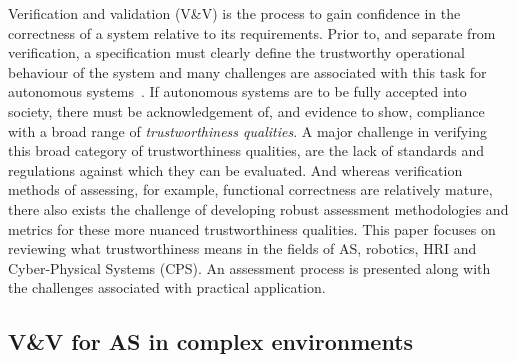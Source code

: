 Verification and validation (V\&V) is the process to gain confidence in the correctness of a system relative to its requirements. Prior to, and separate from verification, a specification must clearly define the trustworthy operational behaviour of the system and many challenges are associated with this task for autonomous systems~\cite{Abeywickrama2022}. 
%
%
If autonomous systems are to be fully accepted into society, there must be acknowledgement of, and evidence to show, compliance with a broad range of \emph{trustworthiness qualities}. 
% 
A major challenge in verifying this broad category of trustworthiness qualities, are the lack of standards and regulations against which they can be evaluated. And whereas verification methods of assessing, for example, functional correctness are relatively mature, there also exists the challenge of developing robust assessment methodologies and metrics for these more nuanced trustworthiness qualities. 
%
%
This paper focuses on reviewing what trustworthiness means in the fields of AS, robotics, HRI and Cyber-Physical Systems (CPS). An assessment process is presented along with the challenges associated with practical application.


\subsection{V\&V for AS in complex environments} \label{sec:intro-vav}

